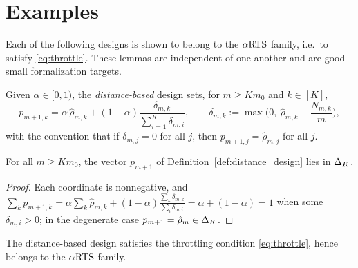 \section{Examples}
\label{sec:design_examples}

Each of the following designs is shown to belong to the $\alpha\text{RTS}$ family, i.e.\ to
satisfy \eqref{eq:throttle}. These lemmas are independent of one another and are
good small formalization targets.

\begin{definition}\label{def:distance_design}
\leanok
{}
Given $\alpha \in [0,1)$, the \emph{distance-based} design sets, for
$m \ge K m_0$ and $k \in [K]$,
\[
  p_{m+1,k} = \alpha\, \hat{\rho}_{m,k}
  + (1-\alpha)\frac{\delta_{m,k}}{\sum_{i=1}^K \delta_{m,i}},
  \qquad
  \delta_{m,k} := \max\!\Big(0,\ \hat{\rho}_{m,k} - \frac{N_{m,k}}{m}\Big),
\]
with the convention that if $\delta_{m,j} = 0$ for all $j$, then
$p_{m+1,j} = \hat{\rho}_{m,j}$ for all $j$.
\end{definition}

\begin{lemma}\label{lem:distance_simplex}
\leanok
{}
For all $m \ge K m_0$, the vector $p_{m+1}$ of Definition~\ref{def:distance_design}
lies in $\Delta_K$.
\end{lemma}

\begin{proof}\leanok
Each coordinate is nonnegative, and
$\sum_k p_{m+1,k} = \alpha \sum_k \hat{\rho}_{m,k}
 + (1-\alpha)\frac{\sum_k \delta_{m,k}}{\sum_i \delta_{m,i}} = \alpha + (1-\alpha) = 1$
when some $\delta_{m,i}>0$; in the degenerate case $p_{m+1}=\hat{\rho}_m \in \Delta_K$.
\end{proof}

\begin{lemma}\label{lem:distance_isARTS}
\leanok
{}
The distance-based design satisfies the throttling condition \eqref{eq:throttle},
hence belongs to the $\alpha\text{RTS}$ family.
\end{lemma}

